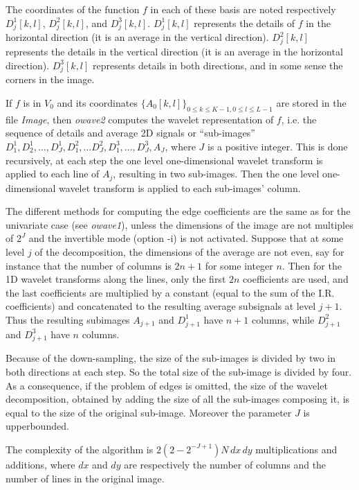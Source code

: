 The coordinates of the function \( f \) in each of these basis are noted 
respectively $D^{1}_{j}[k,l]$, $D^{2}_{j}[k,l]$, and $D^{3}_{j}[k,l]$. 
$D^{1}_{j}[k,l]$ represents the details of $f$ in the horizontal direction 
(it is an average in the vertical direction). \( D^{2}_{j}[k,l] \) represents 
the details in the vertical direction (it is an average in the horizontal 
direction). \( D^{3}_{j}[k,l] \) represents details in both directions, 
and in some sense the corners in the image. 

If $f$ is in ${ V}_{0}$ and its coordinates 
$\{A_{0}[k,l]\}_{0 \leq k \leq K-1, 0 \leq l \leq L-1}$ are stored in the file 
{\em Image}, then {\em owave2} computes the wavelet representation of $f$, 
i.e. the sequence of details and average 2D signals or ``sub-images'' 
$D^{1}_{1}, D^{1}_{2}, \ldots, D^{1}_{J}, D^{2}_{1}, \ldots D^{2}_{J}, 
D^{3}_{1}, \ldots, D^{3}_{J}, A_{J}$, 
where $J$ is a positive integer. This is done recursively, 
at each step the one level one-dimensional wavelet transform is applied 
to each line of \( A_{j} \), resulting in two sub-images. Then the one level 
one-dimensional wavelet transform is applied to each sub-images' column. 

The different methods for computing the edge coefficients are the same as 
for the univariate case (see {\em owave1}), unless the dimensions 
of the image are not multiples of $2^J$ and the invertible mode (option -i) 
is not activated. Suppose that at some level $j$
of the decomposition, the dimensions of the average are not even, say for 
instance that the number of columns is $2n+1$ for some integer $n$. 
Then for the 1D wavelet transforms along the lines, only the first $2n$ 
coefficients are used, and the last coefficients are multiplied by a constant 
(equal to the sum of the I.R. coefficients) and concatenated 
to the resulting average subsignals at level $j+1$. Thus the resulting 
subimages $A_{j+1}$ and $D^{1}_{j+1}$ have $n+1$ columns, while 
$D^{2}_{j+1}$ and $D^{3}_{j+1}$ have $n$ columns.


Because of the down-sampling, the size of the sub-images is divided by two 
in both directions at each step. So the total size of the sub-image 
is divided by four. As a consequence, if the problem of edges is omitted, 
the size of the wavelet decomposition, obtained by adding the size of all 
the sub-images composing it, is equal to the size of the original sub-image. 
Moreover the parameter $J$ is upperbounded. 

The complexity of the algorithm is $2(2 - 2^{-J+1}) N \, dx \, dy$ 
multiplications and additions, where \( dx \) and \( dy \) are respectively 
the number of columns and the number of lines in the original image. 

